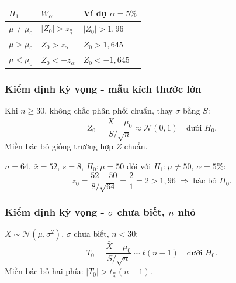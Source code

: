 \documentclass[12pt,a4paper]{article}
\begin{document}
\begin{congthuc}[title={Miền bác bỏ cho kiểm định $\mu$, $\sigma$ biết}]
  \begin{center}
  \begin{tabular}{lll}
    \toprule
    $H_1$ & $W_\alpha$ & Ví dụ $\alpha=5\%$ \\
    \midrule
    $\mu \ne \mu_0$ & $|Z_0| > z_{\frac{\alpha}{2}}$ & $|Z_0| > 1{,}96$ \\
    $\mu > \mu_0$ & $Z_0 > z_\alpha$ & $Z_0 > 1{,}645$ \\
    $\mu < \mu_0$ & $Z_0 < -z_\alpha$ & $Z_0 < -1{,}645$ \\
    \bottomrule
  \end{tabular}
  \end{center}
\end{congthuc}

\subsubsection{Kiểm định kỳ vọng - mẫu kích thước lớn}

\begin{phuongphap}[title={Mẫu lớn, $\sigma$ chưa biết}]
  Khi $n \ge 30$, không chắc phân phối chuẩn, thay $\sigma$ bằng $S$:
  \[
    Z_0 = \dfrac{\bar{X} - \mu_0}{S/\sqrt{n}} \approx \mathcal{N}(0,1) \quad \text{dưới } H_0.
  \]
  Miền bác bỏ giống trường hợp $Z$ chuẩn.
\end{phuongphap}

\begin{vidu}[title={Kiểm định mẫu lớn}]
$n=64$, $\bar{x}=52$, $s=8$, $H_0:\mu=50$ đối với $H_1:\mu \ne 50$, $\alpha=5\%$:
\[
  z_0 = \dfrac{52-50}{8/\sqrt{64}} = \dfrac{2}{1} = 2 > 1{,}96 \;\Rightarrow\; \text{bác bỏ } H_0.
\]
\end{vidu}

\subsubsection{Kiểm định kỳ vọng - $\sigma$ chưa biết, $n$ nhỏ}

\begin{congthuc}[title={Kiểm định $t$}]
  $X \sim \mathcal{N}(\mu,\sigma^2)$, $\sigma$ chưa biết, $n < 30$:
  \[
    T_0 = \dfrac{\bar{X} - \mu_0}{S/\sqrt{n}} \sim t(n-1) \quad \text{dưới } H_0.
  \]
  Miền bác bỏ hai phía: $|T_0| > t_{\frac{\alpha}{2}}(n-1)$.
\end{congthuc}
\end{document}
